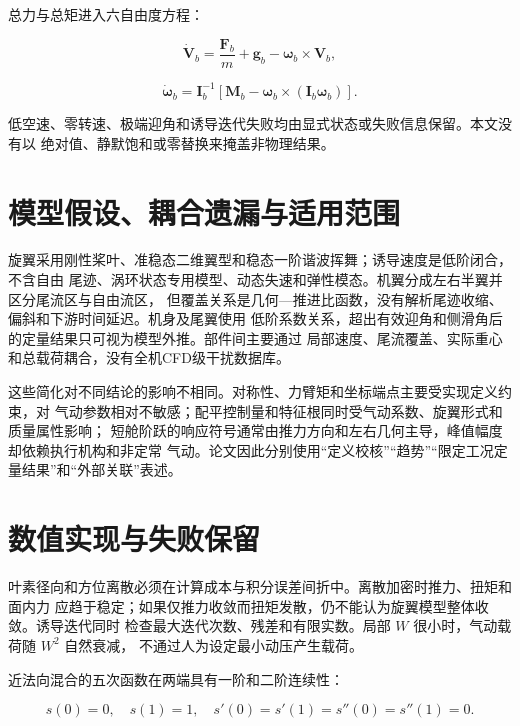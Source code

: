 \documentclass[UTF8,12pt,oneside,openany,fontset=windows]{ctexbook}
\begin{document}
总力与总矩进入六自由度方程：

\begin{equation}
\dot{\mathbf V}_b=\frac{\mathbf F_b}{m}+\mathbf g_b
-\boldsymbol\omega_b\times\mathbf V_b,
\end{equation}

\begin{equation}
\dot{\boldsymbol\omega}_b=\mathbf I_b^{-1}
\left[\mathbf M_b-\boldsymbol\omega_b\times(\mathbf I_b\boldsymbol\omega_b)\right].
\end{equation}

低空速、零转速、极端迎角和诱导迭代失败均由显式状态或失败信息保留。本文没有以 绝对值、静默饱和或零替换来掩盖非物理结果。

\section{模型假设、耦合遗漏与适用范围}

旋翼采用刚性桨叶、准稳态二维翼型和稳态一阶谐波挥舞；诱导速度是低阶闭合，不含自由 尾迹、涡环状态专用模型、动态失速和弹性模态。机翼分成左右半翼并区分尾流区与自由流区， 但覆盖关系是几何—推进比函数，没有解析尾迹收缩、偏斜和下游时间延迟。机身及尾翼使用 低阶系数关系，超出有效迎角和侧滑角后的定量结果只可视为模型外推。部件间主要通过 局部速度、尾流覆盖、实际重心和总载荷耦合，没有全机CFD级干扰数据库。

这些简化对不同结论的影响不相同。对称性、力臂矩和坐标端点主要受实现定义约束，对 气动参数相对不敏感；配平控制量和特征根同时受气动系数、旋翼形式和质量属性影响； 短舱阶跃的响应符号通常由推力方向和左右几何主导，峰值幅度却依赖执行机构和非定常 气动。论文因此分别使用“定义校核”“趋势”“限定工况定量结果”和“外部关联”表述。

\section{数值实现与失败保留}

叶素径向和方位离散必须在计算成本与积分误差间折中。离散加密时推力、扭矩和面内力 应趋于稳定；如果仅推力收敛而扭矩发散，仍不能认为旋翼模型整体收敛。诱导迭代同时 检查最大迭代次数、残差和有限实数。局部 \(W\) 很小时，气动载荷随 \(W^2\) 自然衰减， 不通过人为设定最小动压产生载荷。

近法向混合的五次函数在两端具有一阶和二阶连续性：

\begin{equation}
s(0)=0,\quad s(1)=1,\quad s'(0)=s'(1)=s''(0)=s''(1)=0.
\end{equation}
\end{document}
